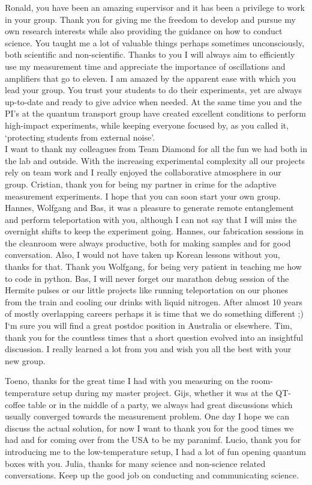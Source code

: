 \documentclass{report}
\begin{document}
Ronald, you have been an amazing supervisor and it has been a privilege to work in your group. Thank you for giving me the freedom to develop and pursue my own research interests while also providing the guidance on how to conduct science. You taught me a lot of valuable things perhaps sometimes unconsciously, both scientific and non-scientific. Thanks to you I will always aim to efficiently use my measurement time and appreciate the importance of oscillations and amplifiers that go to eleven. I am amazed by the apparent ease with which you lead your group. You trust your students to do their experiments, yet are always up-to-date and ready to give advice when needed. At the same time you and the PI's at the quantum transport group have created excellent conditions to perform high-impact experiments, while keeping everyone focused by, as you called it, `protecting students from external noise'. \\
\newpage
I want to thank my colleagues from Team Diamond for all the fun we had both in the lab and outside. With the increasing experimental complexity all our projects rely on team work and I really enjoyed the collaborative atmosphere in our group. Cristian, thank you for being my partner in crime for the adaptive measurement experiments. I hope that you can soon start your own group. Hannes, Wolfgang and Bas, it was a pleasure to generate remote entanglement and perform teleportation with you, although I can not say that I will miss the overnight shifts to keep the experiment going. Hannes, our fabrication sessions in the cleanroom were always productive, both for making samples and for good conversation. Also, I would not have taken up Korean lessons without you, thanks for that. Thank you Wolfgang, for being very patient in teaching me how to code in python. Bas, I will never forget our marathon debug session of the Hermite pulses or our little projects like running teleportation on our phones from the train and cooling our drinks with liquid nitrogen. After almost 10 years of mostly overlapping careers perhaps it is time that we do something different ;) I`m sure you will find a great postdoc position in Australia or elsewhere. Tim, thank you for the countless times that a short question evolved into an insightful discussion. I really learned a lot from you and wish you all the best with your new group.

Toeno, thanks for the great time I had with you measuring on the room-temperature setup during my master project. Gijs, whether it was at the QT-coffee table or in the middle of a party, we always had great discussions which usually converged towards the measurement problem. One day I hope we can discuss the actual solution, for now I want to thank you for the good times we had and for coming over from the USA to be my paranimf. Lucio, thank you for introducing me to the low-temperature setup, I had a lot of fun opening quantum boxes with you. Julia, thanks for many science and non-science related conversations. Keep up the good job on conducting and communicating science. 
\end{document}
